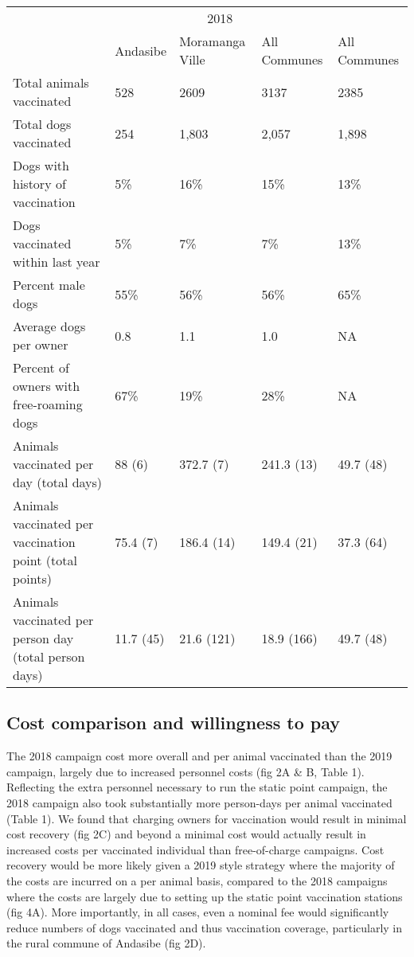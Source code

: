 \documentclass[tropicalmed,article,submit,moreauthors,pdftex]{mdpi}
\begin{document}
\captionsetup[table]{labelformat=empty,skip=1pt}
\begin{longtable}{lllll}
\toprule
& \multicolumn{3}{c}{2018} & \\ 
 \cmidrule(lr){2-4}
 & Andasibe & Moramanga Ville & All Communes & All Communes \\ 
\midrule
Total animals 
 vaccinated & 528 & 2609 & 3137 & 2385 \\ 
Total dogs 
 vaccinated & 254 & 1,803 & 2,057 & 1,898 \\ 
Dogs with history of vaccination & 5\% & 16\% & 15\% & 13\% \\ 
Dogs vaccinated within last year & 5\% & 7\% & 7\% & 13\% \\ 
Percent male dogs & 55\% & 56\% & 56\% & 65\% \\ 
Average dogs per owner & 0.8 & 1.1 & 1.0 & NA \\ 
Percent of owners with 
 free-roaming dogs & 67\% & 19\% & 28\% & NA \\ 
Animals vaccinated per day (total days) & 88 (6) & 372.7 (7) & 241.3 (13) & 49.7 (48) \\ 
Animals vaccinated per 
 vaccination point (total points) & 75.4 (7) & 186.4 (14) & 149.4 (21) & 37.3 (64) \\ 
Animals vaccinated per 
 person day (total person days) & 11.7 (45) & 21.6 (121) & 18.9 (166) & 49.7 (48) \\ 
\bottomrule
\end{longtable}

\hypertarget{cost-comparison-and-willingness-to-pay}{%
\subsection{Cost comparison and willingness to
pay}\label{cost-comparison-and-willingness-to-pay}}

The 2018 campaign cost more overall and per animal vaccinated than the
2019 campaign, largely due to increased personnel costs (fig 2A \& B,
Table 1). Reflecting the extra personnel necessary to run the static
point campaign, the 2018 campaign also took substantially more
person-days per animal vaccinated (Table 1). We found that charging
owners for vaccination would result in minimal cost recovery (fig 2C)
and beyond a minimal cost would actually result in increased costs per
vaccinated individual than free-of-charge campaigns. Cost recovery would
be more likely given a 2019 style strategy where the majority of the
costs are incurred on a per animal basis, compared to the 2018 campaigns
where the costs are largely due to setting up the static point
vaccination stations (fig 4A). More importantly, in all cases, even a
nominal fee would significantly reduce numbers of dogs vaccinated and
thus vaccination coverage, particularly in the rural commune of Andasibe
(fig 2D).
\end{document}
